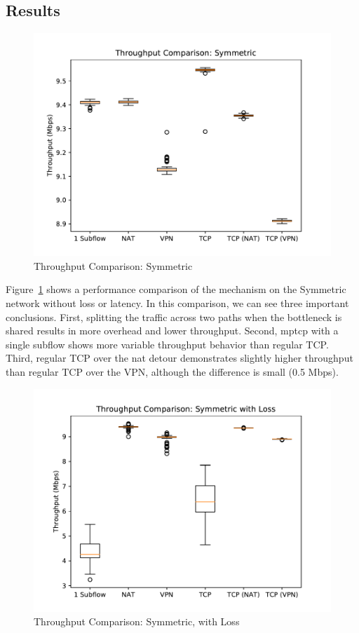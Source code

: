 \documentclass{cwru}
\begin{document}
\subsection{Results}

\begin{figure}
  \centering
  \includegraphics[height=0.45\textheight]{figures/sym.pdf}
  \caption{Throughput Comparison: Symmetric}
  \label{fig:sym}
\end{figure}

Figure~\ref{fig:sym} shows a performance comparison of the mechanism on the
Symmetric network without loss or latency. In this comparison, we can see three
important conclusions. First, splitting the traffic across two paths when the
bottleneck is shared results in more overhead and lower throughput. Second,
\ac{mptcp} with a single subflow shows more variable throughput behavior than
regular TCP. Third, regular TCP over the \ac{nat} detour demonstrates slightly
higher throughput than regular TCP over the VPN, although the difference is
small (0.5 Mbps).

\begin{figure}
  \centering
  \includegraphics[height=0.45\textheight]{figures/sym-lossy.pdf}
  \caption{Throughput Comparison: Symmetric, with Loss}
  \label{fig:sym_lossy}
\end{figure}
\end{document}
